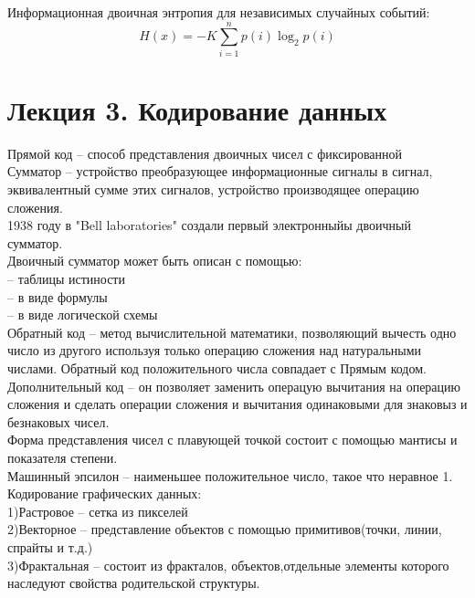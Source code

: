 \documentclass[a4paper, 12pt]{article}
\begin{document}
\begin{mdframed}[backgroundcolor=blue!20] 
       Информационная двоичная энтропия для независимых случайных событий:\\
       \[
       	H(x) = -K\sum_{i=1}^n p(i) \log_2 p(i)
       \]
    \end{mdframed}


\section*{Лекция 3. Кодирование данных}

Прямой код -- способ представления двоичных чисел с фиксированной \\

Сумматор -- устройство преобразующее информационные сигналы в сигнал, эквивалентный сумме этих сигналов, устройство производящее операцию сложения.\\
1938 году в "Bell laboratories" создали первый электронныйы двоичный сумматор.\\

Двоичный сумматор может быть описан с помощью:\\
-- таблицы истиности\\
-- в виде формулы\\
-- в виде логической схемы\\

Обратный код -- метод вычислительной математики, позволяющий вычесть одно число из другого используя только операцию сложения над натуральными числами. Обратный код положительного числа совпадает с Прямым кодом.\\

Дополнительный код -- он позволяет заменить операцую вычитания на операцию сложения и сделать операции сложения и вычитания одинаковыми для знаковыз и безнаковых чисел.\\

Форма представления чисел с плавующей точкой состоит с помощью мантисы и показателя степени.\\

Машинный эпсилон -- наименьшее положительное число, такое что неравное 1.\\

Кодирование графических данных:\\
1)Растровое -- сетка из пикселей\\
2)Векторное -- представление объектов с помощью примитивов(точки, линии, спрайты и т.д.)\\
3)Фрактальная --  состоит из фракталов, объектов,отдельные элементы которого наследуют свойства родительской структуры.\\
\end{document}
